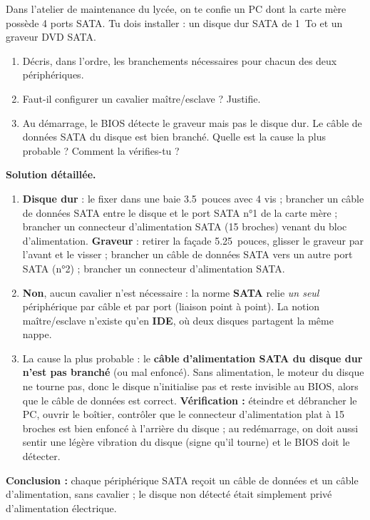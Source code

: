 \documentclass[11pt]{article}
\begin{document}
\begin{exoresolu}
Dans l'atelier de maintenance du lycée, on te confie un PC dont la carte mère possède 4 ports SATA. Tu dois installer : un disque dur SATA de \SI{1}{To} et un graveur DVD SATA.
\begin{enumerate}
\item Décris, dans l'ordre, les branchements nécessaires pour chacun des deux périphériques.
\item Faut-il configurer un cavalier maître/esclave ? Justifie.
\item Au démarrage, le BIOS détecte le graveur mais pas le disque dur. Le câble de données SATA du disque est bien branché. Quelle est la cause la plus probable ? Comment la vérifies-tu ?
\end{enumerate}
\tcblower
\textbf{Solution détaillée.}
\begin{enumerate}
\item \textbf{Disque dur} : le fixer dans une baie \SI{3,5}{pouces} avec 4 vis ; brancher un câble de données SATA entre le disque et le port SATA n°1 de la carte mère ; brancher un connecteur d'alimentation SATA (15 broches) venant du bloc d'alimentation. \textbf{Graveur} : retirer la façade \SI{5,25}{pouces}, glisser le graveur par l'avant et le visser ; brancher un câble de données SATA vers un autre port SATA (n°2) ; brancher un connecteur d'alimentation SATA.
\item \textbf{Non}, aucun cavalier n'est nécessaire : la norme \textbf{SATA} relie \emph{un seul} périphérique par câble et par port (liaison point à point). La notion maître/esclave n'existe qu'en \textbf{IDE}, où deux disques partagent la même nappe.
\item La cause la plus probable : le \textbf{câble d'alimentation SATA du disque dur n'est pas branché} (ou mal enfoncé). Sans alimentation, le moteur du disque ne tourne pas, donc le disque n'initialise pas et reste invisible au BIOS, alors que le câble de données est correct. \textbf{Vérification :} éteindre et débrancher le PC, ouvrir le boîtier, contrôler que le connecteur d'alimentation plat à 15 broches est bien enfoncé à l'arrière du disque ; au redémarrage, on doit aussi sentir une légère vibration du disque (signe qu'il tourne) et le BIOS doit le détecter.
\end{enumerate}
\textbf{Conclusion :} chaque périphérique SATA reçoit un câble de données et un câble d'alimentation, sans cavalier ; le disque non détecté était simplement privé d'alimentation électrique.
\end{exoresolu}
\end{document}
